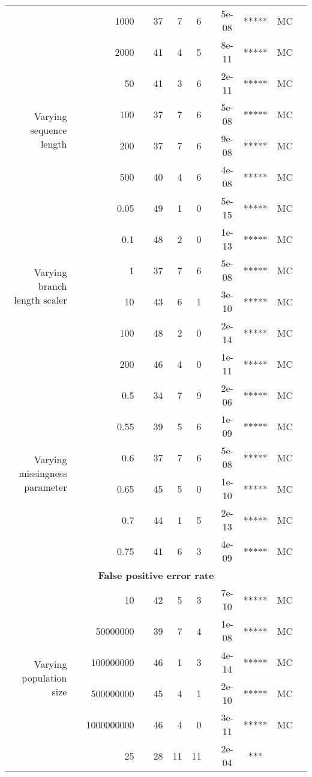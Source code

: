 \begin{table}[!h]
\begin{tabular}{r r r l r r r l c c c l}
   & & 1000 & & 37 & 7 & 6 & & 5e-08 & ***** & MC &  \\
   & & 2000 & & 41 & 4 & 5 & & 8e-11 & ***** & MC &  \\
\midrule
\multirow{ 4}{2cm}{Varying sequence length}
   & & 50 & & 41 & 3 & 6 & & 2e-11 & ***** & MC &  \\
   & & 100 & & 37 & 7 & 6 & & 5e-08 & ***** & MC &  \\
   & & 200 & & 37 & 7 & 6 & & 9e-08 & ***** & MC &  \\
   & & 500 & & 40 & 4 & 6 & & 4e-08 & ***** & MC &  \\
\midrule
\multirow{ 6}{2cm}{Varying branch length scaler}
   & & 0.05 & & 49 & 1 & 0 & & 5e-15 & ***** & MC &  \\
   & & 0.1 & & 48 & 2 & 0 & & 1e-13 & ***** & MC &  \\
   & & 1 & & 37 & 7 & 6 & & 5e-08 & ***** & MC &  \\
   & & 10 & & 43 & 6 & 1 & & 3e-10 & ***** & MC &  \\
   & & 100 & & 48 & 2 & 0 & & 2e-14 & ***** & MC &  \\
   & & 200 & & 46 & 4 & 0 & & 1e-11 & ***** & MC &  \\
\midrule
\multirow{ 6}{2cm}{Varying missingness parameter}
   & & 0.5 & & 34 & 7 & 9 & & 2e-06 & ***** & MC &  \\
   & & 0.55 & & 39 & 5 & 6 & & 1e-09 & ***** & MC &  \\
   & & 0.6 & & 37 & 7 & 6 & & 5e-08 & ***** & MC &  \\
   & & 0.65 & & 45 & 5 & 0 & & 1e-10 & ***** & MC &  \\
   & & 0.7 & & 44 & 1 & 5 & & 2e-13 & ***** & MC &  \\
   & & 0.75 & & 41 & 6 & 3 & & 4e-09 & ***** & MC &  \\
\midrule
\multicolumn{12}{c}{\textbf{False positive error rate}} \\
\midrule
\multirow{ 6}{2cm}{Varying population size}
   & & 10 & & 42 & 5 & 3 & & 7e-10 & ***** & MC &  \\
   & & 50000000 & & 39 & 7 & 4 & & 1e-08 & ***** & MC &  \\
   & & 100000000 & & 46 & 1 & 3 & & 4e-14 & ***** & MC &  \\
   & & 500000000 & & 45 & 4 & 1 & & 2e-10 & ***** & MC &  \\
   & & 1000000000 & & 46 & 4 & 0 & & 3e-11 & ***** & MC &  \\
\midrule
\multirow{ 6}{2cm}{Varying number of taxa}
   & & 25 & & 28 & 11 & 11 & & 2e-04 & *** &  &  \\

\end{tabular}
\end{table}

